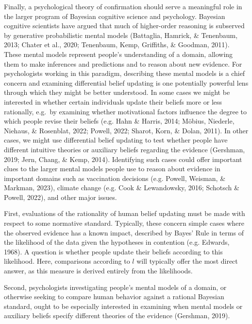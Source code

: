 \documentclass[10pt, letterpaper]{article}
\begin{document}
Finally, a psychological theory of confirmation should serve a
meaningful role in the larger program of Bayesian cognitive science and
psychology. Bayesian cognitive scientists have argued that much of
higher-order reasoning is subserved by generative probabilistic mental
models (Battaglia, Hamrick, \& Tenenbaum, 2013; Chater et al., 2020;
Tenenbaum, Kemp, Griffiths, \& Goodman, 2011). These mental models
represent people's understanding of a domain, allowing them to make
inferences and predictions and to reason about new evidence. For
psychologists working in this paradigm, describing these mental models
is a chief concern and examining differential belief updating is one
potentially powerful lens through which they might be better understood.
In some cases we might be interested in whether certain individuals
update their beliefs more or less rationally, e.g.~by examining whether
motivational factors influence the degree to which people revise their
beliefs (e.g. Hahn \& Harris, 2014; Möbius, Niederle, Niehaus, \&
Rosenblat, 2022; Powell, 2022; Sharot, Korn, \& Dolan, 2011). In other
cases, we might use differential belief updating to test whether people
have different intuitive theories or auxiliary beliefs regarding the
evidence (Gershman, 2019; Jern, Chang, \& Kemp, 2014). Identifying such
cases could offer important clues to the larger mental models people use
to reason about evidence in important domains such as vaccination
decisions (e.g. Powell, Weisman, \& Markman, 2023), climate change (e.g.
Cook \& Lewandowsky, 2016; Schotsch \& Powell, 2022), and other major
issues.

First, evaluations of the rationality of human belief updating must be
made with respect to some normative standard. Typically, these concern
simple cases where the observed evidence has a known impact, described
by Bayes' Rule in terms of the likelihood of the data given the
hypotheses in contention (e.g. Edwards, 1968). A question is whether
people update their beliefs according to this likelihood. Here,
comparisons according to \(l\) will typically offer the most direct
answer, as this measure is derived entirely from the likelihoods.

Second, psychologists investigating people's mental models of a domain,
or otherwise seeking to compare human behavior against a rational
Bayesian standard, ought to be especially interested in examining when
mental models or auxiliary beliefs specify different theories of the
evidence (Gershman, 2019).
\end{document}
